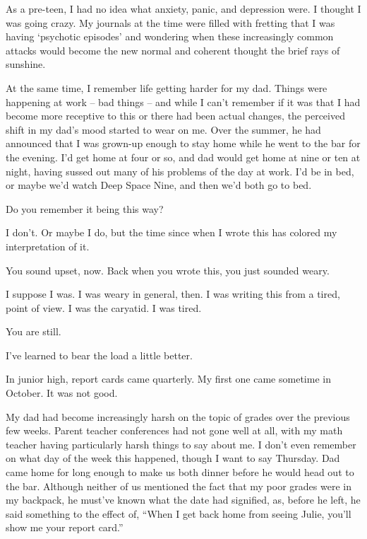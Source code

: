 \begin{paracol}{2}
\begin{leftcolumn}
As a pre-teen, I had no idea what anxiety, panic, and depression were. I thought I was going crazy. My journals at the time were filled with fretting that I was having `psychotic episodes' and wondering when these increasingly common attacks would become the new normal and coherent thought the brief rays of sunshine.

At the same time, I remember life getting harder for my dad. Things were happening at work -- bad things -- and while I can't remember if it was that I had become more receptive to this or there had been actual changes, the perceived shift in my dad's mood started to wear on me. Over the summer, he had announced that I was grown-up enough to stay home while he went to the bar for the evening. I'd get home at four or so, and dad would get home at nine or ten at night, having sussed out many of his problems of the day at work. I'd be in bed, or maybe we'd watch Deep Space Nine, and then we'd both go to bed.

\begin{ally}
Do you remember it being this way?
\end{ally}
I don't. Or maybe I do, but the time since when I wrote this has colored my interpretation of it.

\begin{ally}
You sound upset, now. Back when you wrote this, you just sounded weary.
\end{ally}
I suppose I was. I was weary in general, then. I was writing this from a tired, point of view. I was the caryatid. I was tired.

\begin{ally}
You are still.
\end{ally}
I've learned to bear the load a little better.

In junior high, report cards came quarterly. My first one came sometime in October. It was not good.

My dad had become increasingly harsh on the topic of grades over the previous few weeks. Parent teacher conferences had not gone well at all, with my math teacher having particularly harsh things to say about me. I don't even remember on what day of the week this happened, though I want to say Thursday. Dad came home for long enough to make us both dinner before he would head out to the bar. Although neither of us mentioned the fact that my poor grades were in my backpack, he must've known what the date had signified, as, before he left, he said something to the effect of, ``When I get back home from seeing Julie, you'll show me your report card.''


\end{leftcolumn}
\end{paracol}
